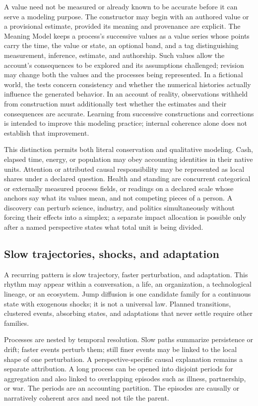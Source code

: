 \documentclass[10pt]{article}
\begin{document}
A value need not be measured or already known to be accurate before it can
serve a modeling purpose. The constructor may begin with an authored value or
a provisional estimate, provided its meaning and provenance are explicit.
The Meaning Model keeps a process's successive values as a value series whose
points carry the time, the value or state, an optional band, and a tag
distinguishing measurement, inference, estimate, and authorship.
Such values allow the account's consequences to be explored and its
assumptions challenged; revision may change both the values and the processes
being represented. In a fictional world, the tests concern consistency and
whether the numerical histories actually influence the generated behavior.
In an account of reality, observations withheld from construction must
additionally test whether the estimates and their consequences are accurate.
Learning from successive constructions and corrections is intended to improve
this modeling practice; internal coherence alone does not establish that
improvement.

This distinction permits both literal conservation and qualitative modeling.
Cash, elapsed time, energy, or population may obey accounting identities in
their native units. Attention or attributed causal responsibility may be
represented as local shares under a declared question. Health and standing are
concurrent categorical or externally measured process fields, or readings on a
declared scale whose anchors say what its values mean, and not competing pieces
of a person. A discovery can
perturb science, industry, and politics simultaneously without forcing their
effects into a simplex; a separate impact allocation is possible only after a
named perspective states what total unit is being divided.

\subsection{Slow trajectories, shocks, and adaptation}

A recurring pattern is slow trajectory, faster perturbation, and
adaptation. This rhythm may appear within a conversation, a life, an
organization, a technological lineage, or an ecosystem. Jump diffusion is one
candidate family for a continuous state with exogenous shocks; it is not a
universal law. Planned transitions, clustered events, absorbing states, and
adaptations that never settle require other families.

Processes are nested by temporal resolution. Slow paths summarize persistence
or drift; faster events perturb them; still finer events may be linked to the
local shape of one perturbation. A perspective-specific causal explanation remains a
separate attribution. A long process can be opened into disjoint periods
for aggregation and also linked to overlapping episodes such as illness,
partnership, or war. The periods are an accounting partition. The episodes are
causally or narratively coherent arcs and need not tile the parent.
\end{document}
